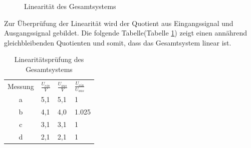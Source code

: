 \begin{figure}[H]
  \caption{Linearität des Gesamtsystems}
\end{figure}

Zur Überprüfung der Linearität wird der Quotient aus Eingangssignal und Ausgangssignal gebildet. Die folgende Tabelle(Tabelle \ref{tab:lin}) zeigt einen annährend gleichbleibenden Quotienten und somit, dass das Gesamtsystem linear ist. 
\begin{table}[H]
\centering
\begin{tabular}{clll}
\cline{1-4}
Messung & $\frac{U_{ein}}{V}$ & $\frac{U_{aus}}{V}$ &$\frac{U_{ein}}{U_{aus}}$ \\ 
\cline{1-4}
a & 5,1                                        & 5,1                                       & 1                         \\
b & 4,1                                        & 4,0                                       & 1.025                     \\
c & 3,1                                        & 3,1                                       & 1                         \\
d & 2,1                                        & 2,1                                       & 1                        
\end{tabular}
\caption{Linearitätsprüfung des Gesamtsystems}
\label{tab:lin} 
\end{table}






